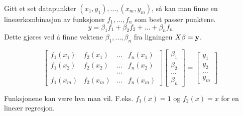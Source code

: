 Gitt et set datapunkter $(x_1,y_1), ..., (x_m,y_m)$,
så kan man finne en lineærkombinasjon av funksjoner $f_1, ..., f_n$
som best passer punktene.
$$y = \beta_1f_1 + \beta_2f_2 + ... + \beta_nf_n$$
Dette gjøres ved å finne vektene $\beta_1, ..., \beta_n$
fra ligningen $X\mathbf{\beta}=\mathbf{y}$.

$$\begin{bmatrix}
    f_1(x_1) & f_2(x_1) & ... & f_n(x_1) \\
    f_1(x_2) & f_2(x_2) & ... & f_n(x_2) \\
             &          & ... &          \\
    f_1(x_m) & f_2(x_m) & ... & f_n(x_m)
  \end{bmatrix}
  \begin{bmatrix}
    \beta_1 \\
    \beta_2 \\
    ...     \\
    \beta_n
  \end{bmatrix}
  =
  \begin{bmatrix}
    y_1 \\
    y_2 \\
    ...     \\
    y_m
  \end{bmatrix}
$$

Funksjonene kan være hva man vil.
F.eks. $f_1(x) = 1$ og $f_2(x) = x$ for en lineær regresjon.
